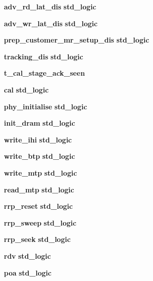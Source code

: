 \begin{DoxyCompactItemize}
\item 
{\bf adv\+\_\+rd\+\_\+lat\+\_\+dis} {\bfseries {\bfseries \textcolor{comment}{std\+\_\+logic}\textcolor{vhdlchar}{ }}} 
\item 
{\bf adv\+\_\+wr\+\_\+lat\+\_\+dis} {\bfseries {\bfseries \textcolor{comment}{std\+\_\+logic}\textcolor{vhdlchar}{ }}} 
\item 
{\bf prep\+\_\+customer\+\_\+mr\+\_\+setup\+\_\+dis} {\bfseries {\bfseries \textcolor{comment}{std\+\_\+logic}\textcolor{vhdlchar}{ }}} 
\item 
{\bf tracking\+\_\+dis} {\bfseries {\bfseries \textcolor{comment}{std\+\_\+logic}\textcolor{vhdlchar}{ }}} 
\item 
{\bf t\+\_\+cal\+\_\+stage\+\_\+ack\+\_\+seen} {\bfseries  }
\item 
{\bf cal} {\bfseries {\bfseries \textcolor{comment}{std\+\_\+logic}\textcolor{vhdlchar}{ }}} 
\item 
{\bf phy\+\_\+initialise} {\bfseries {\bfseries \textcolor{comment}{std\+\_\+logic}\textcolor{vhdlchar}{ }}} 
\item 
{\bf init\+\_\+dram} {\bfseries {\bfseries \textcolor{comment}{std\+\_\+logic}\textcolor{vhdlchar}{ }}} 
\item 
{\bf write\+\_\+ihi} {\bfseries {\bfseries \textcolor{comment}{std\+\_\+logic}\textcolor{vhdlchar}{ }}} 
\item 
{\bf write\+\_\+btp} {\bfseries {\bfseries \textcolor{comment}{std\+\_\+logic}\textcolor{vhdlchar}{ }}} 
\item 
{\bf write\+\_\+mtp} {\bfseries {\bfseries \textcolor{comment}{std\+\_\+logic}\textcolor{vhdlchar}{ }}} 
\item 
{\bf read\+\_\+mtp} {\bfseries {\bfseries \textcolor{comment}{std\+\_\+logic}\textcolor{vhdlchar}{ }}} 
\item 
{\bf rrp\+\_\+reset} {\bfseries {\bfseries \textcolor{comment}{std\+\_\+logic}\textcolor{vhdlchar}{ }}} 
\item 
{\bf rrp\+\_\+sweep} {\bfseries {\bfseries \textcolor{comment}{std\+\_\+logic}\textcolor{vhdlchar}{ }}} 
\item 
{\bf rrp\+\_\+seek} {\bfseries {\bfseries \textcolor{comment}{std\+\_\+logic}\textcolor{vhdlchar}{ }}} 
\item 
{\bf rdv} {\bfseries {\bfseries \textcolor{comment}{std\+\_\+logic}\textcolor{vhdlchar}{ }}} 
\item 
{\bf poa} {\bfseries {\bfseries \textcolor{comment}{std\+\_\+logic}\textcolor{vhdlchar}{ }}} 
\item 

\end{DoxyCompactItemize}
